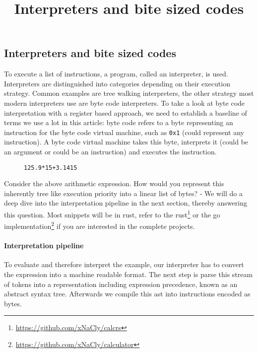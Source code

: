 

\title{Interpreters and bite sized codes}


    \subsection*{Interpreters and bite sized codes}

    To execute a list of instructions, a program, called an interpreter, is
    used. Interpreters are distinguished into categories depending on their
    execution strategy. Common examples are tree walking interpreters, the
    other strategy most modern interpreters use are byte code interpreters. To
    take a look at byte code interpretation with a register based approach, we
    need to establish a baseline of terms we use a lot in this article: byte
    code refers to a byte representing an instruction for the byte code virtual
    machine, such as \texttt{0x1} (could represent any instruction). A byte
    code virtual machine takes this byte, interprets it (could be an argument
    or could be an instruction) and executes the instruction.

    \begin{figure}[H]
        \centering
        \texttt{125.9*15+3.1415}
    \end{figure}

    Consider the above arithmetic expression. How would you represent this
    inherently tree like execution priority into a linear list of bytes? - We
    will do a deep dive into the interpretation pipeline in the next section,
    thereby answering this question. Most snippets will be in rust, refer to
    the
    rust\footnote{\href{https://github.com/xNaCly/calcrs}{https://github.com/xNaCly/calcrs}}
    or the go
    implementation\footnote{\href{https://github.com/xNaCly/calculator}{https://github.com/xNaCly/calculator}}
    if you are interested in the complete projects.

    \paragraph*{Interpretation pipeline} To evaluate and therefore interpret
    the example, our interpreter has to convert the expression into a machine
    readable format. The next step is parse this stream of tokens into a
    representation including expression precedence, known as an abstract syntax
    tree. Afterwards we compile this ast into instructions encoded as bytes.

